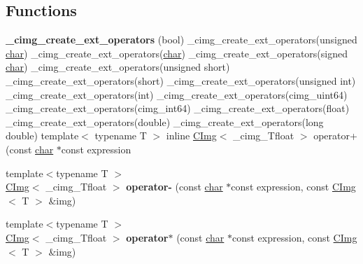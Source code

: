 \subsection*{Functions}
\begin{DoxyCompactItemize}
\item 
\mbox{\label{namespacecimg__library__suffixed_a2236534e3ae502cd898d34eea60db04b}} 
{\bfseries \+\_\+cimg\+\_\+create\+\_\+ext\+\_\+operators} (bool) \+\_\+cimg\+\_\+create\+\_\+ext\+\_\+operators(unsigned \hyperlink{classchar}{char}) \+\_\+cimg\+\_\+create\+\_\+ext\+\_\+operators(\hyperlink{classchar}{char}) \+\_\+cimg\+\_\+create\+\_\+ext\+\_\+operators(signed \hyperlink{classchar}{char}) \+\_\+cimg\+\_\+create\+\_\+ext\+\_\+operators(unsigned short) \+\_\+cimg\+\_\+create\+\_\+ext\+\_\+operators(short) \+\_\+cimg\+\_\+create\+\_\+ext\+\_\+operators(unsigned int) \+\_\+cimg\+\_\+create\+\_\+ext\+\_\+operators(int) \+\_\+cimg\+\_\+create\+\_\+ext\+\_\+operators(cimg\+\_\+uint64) \+\_\+cimg\+\_\+create\+\_\+ext\+\_\+operators(cimg\+\_\+int64) \+\_\+cimg\+\_\+create\+\_\+ext\+\_\+operators(float) \+\_\+cimg\+\_\+create\+\_\+ext\+\_\+operators(double) \+\_\+cimg\+\_\+create\+\_\+ext\+\_\+operators(long double) template$<$ typename T $>$ inline \hyperlink{structcimg__library__suffixed_1_1CImg}{C\+Img}$<$ \+\_\+cimg\+\_\+\+Tfloat $>$ operator+(const \hyperlink{classchar}{char} $\ast$const expression
\item 
\mbox{\label{namespacecimg__library__suffixed_afa92bc3a6441c4003ad7c058e3c75f1b}} 
{\footnotesize template$<$typename T $>$ }\\\hyperlink{structcimg__library__suffixed_1_1CImg}{C\+Img}$<$ \+\_\+cimg\+\_\+\+Tfloat $>$ {\bfseries operator-\/} (const \hyperlink{classchar}{char} $\ast$const expression, const \hyperlink{structcimg__library__suffixed_1_1CImg}{C\+Img}$<$ T $>$ \&img)
\item 
\mbox{\label{namespacecimg__library__suffixed_a521900f5178315a7c1b186a83667306d}} 
{\footnotesize template$<$typename T $>$ }\\\hyperlink{structcimg__library__suffixed_1_1CImg}{C\+Img}$<$ \+\_\+cimg\+\_\+\+Tfloat $>$ {\bfseries operator$\ast$} (const \hyperlink{classchar}{char} $\ast$const expression, const \hyperlink{structcimg__library__suffixed_1_1CImg}{C\+Img}$<$ T $>$ \&img)
\item 

\end{DoxyCompactItemize}
